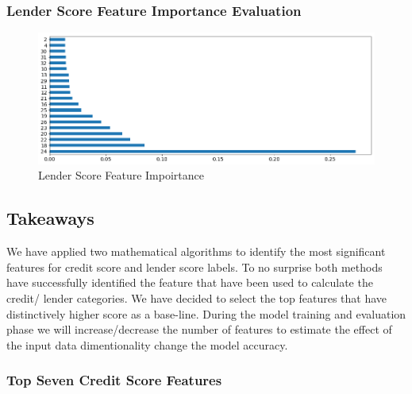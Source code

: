 \hypertarget{lender-score-feature-importance-evaluation}{%
\subsubsection{Lender Score Feature Importance
Evaluation}\label{lender-score-feature-importance-evaluation}}

\begin{Schunk}
\begin{figure}[H]

{\centering \includegraphics[width=1\linewidth]{../../artifacts/lfimportance} 

}

\caption[Lender Score Feature Impoirtance]{Lender Score Feature Impoirtance}\label{fig:lfi}
\end{figure}
\end{Schunk}

\hypertarget{takeaways}{%
\subsection{Takeaways}\label{takeaways}}

We have applied two mathematical algorithms to identify the most
significant features for credit score and lender score labels. To no
surprise both methods have successfully identified the feature that have
been used to calculate the credit/ lender categories. We have decided to
select the top features that have distinctively higher score as a
base-line. During the model training and evaluation phase we will
increase/decrease the number of features to estimate the effect of the
input data dimentionality change the model accuracy.

\hypertarget{top-seven-credit-score-features}{%
\subsubsection{Top Seven Credit Score
Features}\label{top-seven-credit-score-features}}

